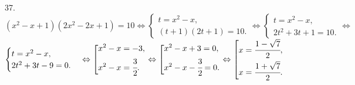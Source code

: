 37. $(x^2-x+1)(2x^2-2x+1)=10 \Leftrightarrow \begin{cases}
t=x^2-x,\\
(t+1)(2t+1)=10.\end{cases}\Leftrightarrow \begin{cases}
t=x^2-x,\\
2t^2+3t+1=10.\end{cases}\Leftrightarrow$\\$ \begin{cases}
t=x^2-x,\\
2t^2+3t-9=0.\end{cases}\Leftrightarrow\left[
      \begin{gathered} x^2-x=-3,\hfill\\
      x^2-x=\cfrac{3}{2}.\hfill \end{gathered}\right.\Leftrightarrow\left[
      \begin{gathered} x^2-x+3=0,\hfill\\
      x^2-x-\cfrac{3}{2}=0.\hfill \end{gathered}\right.\Leftrightarrow\left[
      \begin{gathered} x=\cfrac{1-\sqrt{7}}{2},\hfill\\
      x=\cfrac{1+\sqrt{7}}{2}.\hfill \end{gathered}\right.$\\
